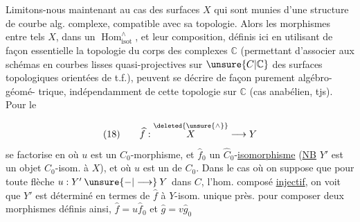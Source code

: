 Limitons-nous maintenant au cas des
surfaces $X$ qui sont munies d'une structure
de courbe alg. complexe, compatible avec sa
topologie. Alors les morphismes entre tels
$X$, dans un $\operatorname{Hom}^{\wedge}_{\mathrm{isot}}$, et leur composition,
définis ici en utilisant de façon essentielle
la topologie du corps des complexes $\mathbb C$
(permettant d'associer aux schémas en courbes
lisses quasi-projectives sur $\unsure{C|\mathbb C}$ des surfaces
topologiques orientées de t.f.), peuvent se
décrire de façon purement algébro-géomé-
trique, indépendamment de cette topologie
sur $\mathbb C$ (cas anabélien, tjs). Pour le

\[
(18)\qquad\widehat f:\overset{\deleted{\unsure{\wedge}}}{X}\longrightarrow Y
\]
se factorise en
où $u$ est un $C_0$-morphisme, et $\widehat f_0$ un $\widehat C_0$-\uline{isomorphisme}
(\uline{NB} $Y'$ est un objet $C_0$-isom. à $X$), et où $u$ est
un  de $C_0$. Dans le cas où on
suppose que pour toute flèche $u:Y'\mathbin{\unsure{-|\longrightarrow}}Y$ dans $C$,
l'hom. composé
\uline{injectif}, on voit que $Y'$ est déterminé
en termes de $\widehat f$ à $Y$-isom. unique près.  
  pour composer deux morphismes définis
ainsi, $\widehat f=u\widehat f_0$ et $\widehat g=v\widehat g_0$
